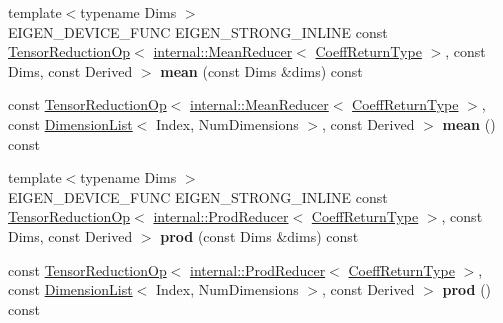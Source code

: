 \begin{DoxyCompactItemize}
\item 
\mbox{\label{class_eigen_1_1_tensor_base_3_01_derived_00_01_read_only_accessors_01_4_a06e3a37a12e88eadb373ab651e57d318}} 
{\footnotesize template$<$typename Dims $>$ }\\E\+I\+G\+E\+N\+\_\+\+D\+E\+V\+I\+C\+E\+\_\+\+F\+U\+NC E\+I\+G\+E\+N\+\_\+\+S\+T\+R\+O\+N\+G\+\_\+\+I\+N\+L\+I\+NE const \hyperlink{class_eigen_1_1_tensor_reduction_op}{Tensor\+Reduction\+Op}$<$ \hyperlink{struct_eigen_1_1internal_1_1_mean_reducer}{internal\+::\+Mean\+Reducer}$<$ \hyperlink{group___sparse_core___module}{Coeff\+Return\+Type} $>$, const Dims, const Derived $>$ {\bfseries mean} (const Dims \&dims) const
\item 
\mbox{\label{class_eigen_1_1_tensor_base_3_01_derived_00_01_read_only_accessors_01_4_ada02c8825f5d38b67586dcf97955e58d}} 
const \hyperlink{class_eigen_1_1_tensor_reduction_op}{Tensor\+Reduction\+Op}$<$ \hyperlink{struct_eigen_1_1internal_1_1_mean_reducer}{internal\+::\+Mean\+Reducer}$<$ \hyperlink{group___sparse_core___module}{Coeff\+Return\+Type} $>$, const \hyperlink{struct_eigen_1_1_dimension_list}{Dimension\+List}$<$ Index, Num\+Dimensions $>$, const Derived $>$ {\bfseries mean} () const
\item 
\mbox{\label{class_eigen_1_1_tensor_base_3_01_derived_00_01_read_only_accessors_01_4_acbe514cd108c35ecda3bc8384c424eb2}} 
{\footnotesize template$<$typename Dims $>$ }\\E\+I\+G\+E\+N\+\_\+\+D\+E\+V\+I\+C\+E\+\_\+\+F\+U\+NC E\+I\+G\+E\+N\+\_\+\+S\+T\+R\+O\+N\+G\+\_\+\+I\+N\+L\+I\+NE const \hyperlink{class_eigen_1_1_tensor_reduction_op}{Tensor\+Reduction\+Op}$<$ \hyperlink{struct_eigen_1_1internal_1_1_prod_reducer}{internal\+::\+Prod\+Reducer}$<$ \hyperlink{group___sparse_core___module}{Coeff\+Return\+Type} $>$, const Dims, const Derived $>$ {\bfseries prod} (const Dims \&dims) const
\item 
\mbox{\label{class_eigen_1_1_tensor_base_3_01_derived_00_01_read_only_accessors_01_4_a416805be85d4fdb721b41eb127e70fdd}} 
const \hyperlink{class_eigen_1_1_tensor_reduction_op}{Tensor\+Reduction\+Op}$<$ \hyperlink{struct_eigen_1_1internal_1_1_prod_reducer}{internal\+::\+Prod\+Reducer}$<$ \hyperlink{group___sparse_core___module}{Coeff\+Return\+Type} $>$, const \hyperlink{struct_eigen_1_1_dimension_list}{Dimension\+List}$<$ Index, Num\+Dimensions $>$, const Derived $>$ {\bfseries prod} () const

\end{DoxyCompactItemize}
